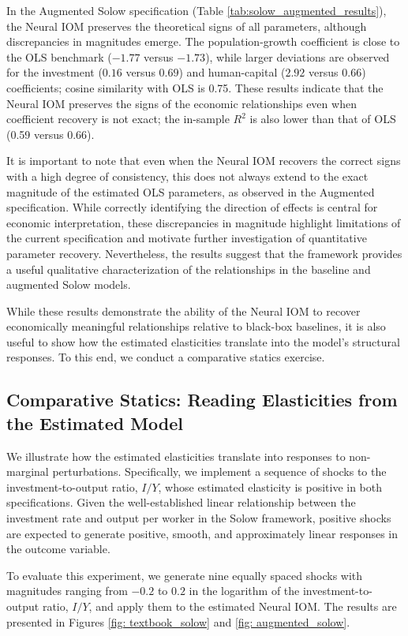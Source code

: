 \documentclass[preprint,12pt,authoryear]{sn-jnl}
\begin{document}
In the Augmented Solow specification (Table \ref{tab:solow_augmented_results}), the Neural IOM preserves the theoretical signs of all parameters, although discrepancies in magnitudes emerge. The population-growth coefficient is close to the OLS benchmark ($-1.77$ versus $-1.73$), while larger deviations are observed for the investment ($0.16$ versus $0.69$) and human-capital ($2.92$ versus $0.66$) coefficients; cosine similarity with OLS is 0.75. These results indicate that the Neural IOM preserves the signs of the economic relationships even when coefficient recovery is not exact; the in-sample $R^2$ is also lower than that of OLS (0.59 versus 0.66).

It is important to note that even when the Neural IOM recovers the correct signs with a high degree of consistency, this does not always extend to the exact magnitude of the estimated OLS parameters, as observed in the Augmented specification. While correctly identifying the direction of effects is central for economic interpretation, these discrepancies in magnitude highlight limitations of the current specification and motivate further investigation of quantitative parameter recovery. Nevertheless, the results suggest that the framework provides a useful qualitative characterization of the relationships in the baseline and augmented Solow models.

While these results demonstrate the ability of the Neural IOM to recover economically meaningful relationships relative to black-box baselines, it is also useful to show how the estimated elasticities translate into the model's structural responses. To this end, we conduct a comparative statics exercise.


\subsection{Comparative Statics: Reading Elasticities from the Estimated Model}

We illustrate how the estimated elasticities translate into responses to non-marginal perturbations. Specifically, we implement a sequence of shocks to the investment-to-output ratio, $I/Y$, whose estimated elasticity is positive in both specifications. Given the well-established linear relationship between the investment rate and output per worker in the Solow framework, positive shocks are expected to generate positive, smooth, and approximately linear responses in the outcome variable.

To evaluate this experiment, we generate nine equally spaced shocks with magnitudes ranging from $-0.2$ to $0.2$ in the logarithm of the investment-to-output ratio, $I/Y$, and apply them to the estimated Neural IOM. The results are presented in Figures \ref{fig: textbook_solow} and \ref{fig: augmented_solow}.
\end{document}
